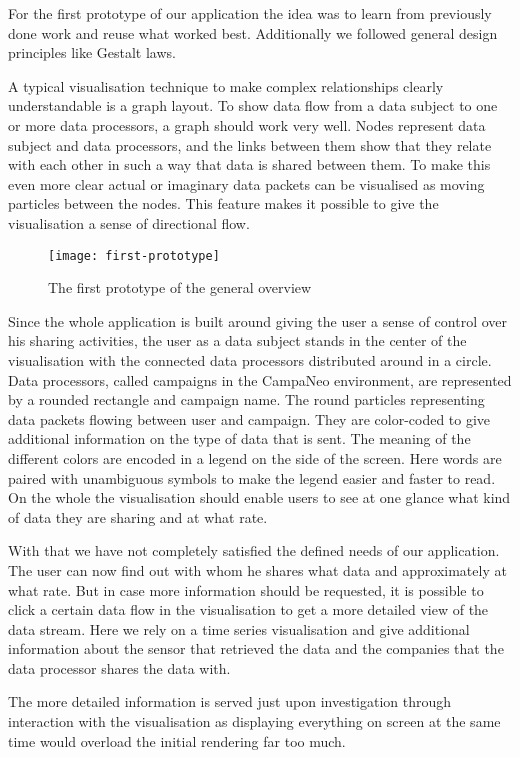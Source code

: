 
For the first prototype of our application the idea was to learn from previously done work and reuse what worked best. Additionally we followed general design principles like Gestalt laws.

A typical visualisation technique to make complex relationships clearly understandable is a graph layout. To show data flow from a data subject to one or more data processors, a graph should work very well.
Nodes represent data subject and data processors, and the links between them show that they relate with each other in such a way that data is shared between them.
To make this even more clear actual or imaginary data packets can be visualised as moving particles between the nodes.
This feature makes it possible to give the visualisation a sense of directional flow.
\begin{figure}
    \centering
    \texttt{[image: first-prototype]}    \caption{The first prototype of the general overview}
    \label{fig:prototype}
\end{figure}

Since the whole application is built around giving the user a sense of control over his sharing activities, the user as a data subject stands in the center of the visualisation with the connected data processors  distributed around in a circle.
Data processors, called campaigns in the CampaNeo environment, are represented by a rounded rectangle and campaign name. The round particles representing data packets flowing between user and campaign. They are color-coded to give additional information on the type of data that is sent.
The meaning of the different colors are encoded in a legend on the side of the screen. Here words are paired with unambiguous symbols to make the legend easier and faster to read.
On the whole the visualisation should enable users to see at one glance what kind of data they are sharing and at what rate.

With that we have not completely satisfied the defined needs of our application.
The user can now find out with whom he shares what data and approximately at what rate.
But in case more information should be requested, it is possible to click a certain data flow in the visualisation to get a more detailed view of the data stream.
Here we rely on a time series visualisation and give additional information about the sensor that retrieved the data and the companies that the data processor shares the data with.

The more detailed information is served just upon investigation through interaction with the visualisation as displaying everything on screen at the same time would overload the initial rendering far too much.

